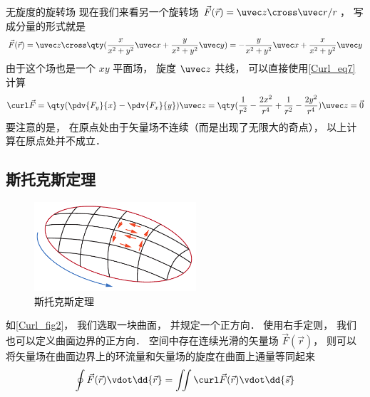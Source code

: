 \begin{exam}{无旋度的旋转场}
现在我们来看另一个旋转场 $\vec F(\vec r) = \uvec z\cross\uvec r /r$， 写成分量的形式就是
\begin{equation}
\vec F(\vec r) = \uvec z \cross \qty(\frac{x}{x^2 + y^2}\uvec x + \frac{y}{x^2 + y^2}\uvec y) = -\frac{y}{x^2 + y^2} \uvec x + \frac{x}{x^2 + y^2}\uvec y
\end{equation}
由于这个场也是一个 $xy$ 平面场， 旋度 $\uvec z$ 共线， 可以直接使用\autoref{Curl_eq7} 计算
\begin{equation}
\curl\vec F = \qty(\pdv{F_y}{x} - \pdv{F_x}{y})\uvec z = \qty(\frac{1}{r^2} - \frac{2x^2}{r^4} + \frac{1}{r^2} - \frac{2y^2}{r^4})\uvec z = \vec 0
\end{equation}
要注意的是， 在原点处由于矢量场不连续（而是出现了无限大的奇点）， 以上计算在原点处并不成立． 
\end{exam}

\subsection{斯托克斯定理}

\begin{figure}[ht]
\centering
\includegraphics[width=6cm]{./figures/Curl2.pdf}
\caption{斯托克斯定理} \label{Curl_fig2}
\end{figure}

如\autoref{Curl_fig2}， 我们选取一块曲面， 并规定一个正方向． 使用右手定则， 我们也可以定义曲面边界的正方向． 空间中存在连续光滑的矢量场 $\vec F(\vec r)$， 则可以将矢量场在曲面边界上的环流量和矢量场的旋度在曲面上通量等同起来
\begin{equation}
\oint \vec F(\vec r) \vdot \dd{\vec r} = \iint \curl \vec F(\vec r) \vdot \dd{\vec s}
\end{equation}


